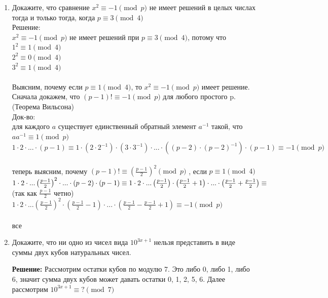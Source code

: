 \documentclass[]{book}
\theoremstyle{definition}
\begin{document}
\begin{enumerate}[resume]
\item Докажите, что сравнение $ x^{2} \equiv {-1} \pmod{p}$ не имеет решений в целых числах тогда и только тогда, когда $ {p} \equiv {3} \pmod{4}$ 
\\
Решение:\\
$ x^{2} \equiv {-1} \pmod{p}$ не имеет решений при $ {p} \equiv {3} \pmod{4}$, потому что \\
$ {1}^{2} \equiv {1} \pmod{4}$ \\
$ {2}^{2} \equiv {0} \pmod{4}$ \\
$ {3}^{2} \equiv {1} \pmod{4}$ \\
\\
Выясним, почему если $ {p} \equiv {1} \pmod{4}$, то $ x^{2} \equiv {-1} \pmod{p}$ имеет решение.\\
Сначала докажем, что $ ({p-1})! \equiv {-1} \pmod{p}$ для любого простого p. (Теорема Вильсона)\\
Док-во:\\
для каждого $a$ существует единственный обратный элемент ${a}^{-1}$ такой, что $ {a}{a}^{-1} \equiv {1} \pmod{p}$ \\

$ 1\cdot2\cdot...\cdot(p-1) \equiv 1\cdot(2\cdot{2}^{-1})\cdot(3\cdot{3}^{-1})\cdot...\cdot((p-2)\cdot({p-2})^{-1})\cdot(p-1)\equiv {-1} \pmod{p}$\\
\\
теперь выясним, почему
$ ({p-1})! \equiv \left({\frac{p-1}{2}}\right)^{2} \pmod{p}$ , если $ {p} \equiv {1} \pmod{4}$\\
$ 1\cdot2\cdot...\left({\frac{p-1}{2}}\right)^{2}\cdot...\cdot(p-2)\cdot(p-1) \equiv\\ 1\cdot2\cdot...\left({\frac{p-1}{2}}\right)\cdot\left({\frac{p-1}{2}}+1\right)\cdot...\cdot\left({\frac{p-1}{2}}+{\frac{p-1}{2}}\right) \equiv $(так как $\frac{p-1}{2}$ четно) \\ $ 1\cdot2\cdot...\left({\frac{p-1}{2}}\right)^{2}\cdot\left({\frac{p-1}{2}}-1\right)\cdot...\cdot\left({\frac{p-1}{2}}-{\frac{p-1}{2}+1}\right) \equiv {-1} \pmod {p}$\\
\\
все


\item Докажите, что ни одно из чисел вида $10^{3x+1}$ нельзя представить в виде суммы двух кубов натуральных чисел.

\textbf{Решение:}
Рассмотрим остатки кубов по модулю 7. Это либо 0, либо 1, либо 6, значит сумма двух кубов может давать остатки 0, 1, 2, 5, 6. Далее рассмотрим $10^{3x+1} \equiv ? \pmod{7}$


\end{enumerate}
\end{document}
